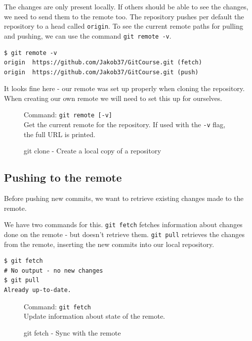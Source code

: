 \documentclass[../main/git_course_main.tex]{subfiles}
\begin{document}
The changes are only present locally. If others should be able to see the changes, we need to send them to the remote too.
The repository pushes per default the repository to a head called \verb$origin$. To see the current remote paths for pulling and pushing, we can use the command \verb$git remote -v$.

\begin{codebox}
\begin{lstlisting}
$ git remote -v
origin	https://github.com/Jakob37/GitCourse.git (fetch)
origin	https://github.com/Jakob37/GitCourse.git (push)
\end{lstlisting}
\end{codebox}

It looks fine here - our remote was set up properly when cloning the repository.
When creating our own remote we will need to set this up for ourselves.

\begin{figure}[h!]
\begin{bluebox}
Command: \verb$git remote [-v]$ \\

Get the current remote for the repository. If used with the \verb$-v$ flag,
the full URL is printed.
\end{bluebox}
\label{command:clone}
\caption{git clone - Create a local copy of a repository}
\end{figure}

\subsection{Pushing to the remote}

Before pushing new commits, we want to retrieve existing changes made to the remote.

We have two commands for this. \verb$git fetch$ fetches information about changes done on the remote - but doesn't retrieve them.
\verb$git pull$ retrieves the changes from the remote, inserting the new commits into our local repository.

\begin{codebox}
\begin{lstlisting}
$ git fetch
# No output - no new changes
$ git pull
Already up-to-date.
\end{lstlisting}
\end{codebox}

\begin{figure}
\begin{bluebox}
Command: \verb$git fetch$ \\

Update information about state of the remote.
\end{bluebox}
\label{command:fetch}
\caption{git fetch - Sync with the remote}
\end{figure}
\end{document}
